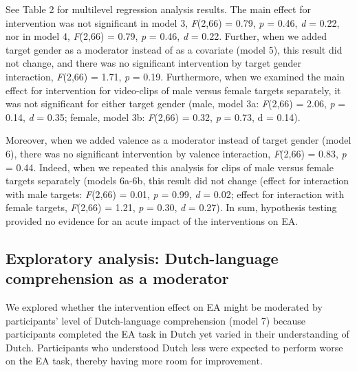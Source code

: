 \documentclass[authordate, empirical]{jote-new-article}
\begin{document}
	See Table 2 for multilevel regression analysis results. The main effect for intervention was not significant in model 3, \emph{F}(2,66) = 0.79, \emph{p} = 0.46, \emph{d} = 0.22, nor in model 4, \emph{F}(2,66) = 0.79, \emph{p} = 0.46, \emph{d} = 0.22. Further, when we added target gender as a moderator instead of as a covariate (model 5), this result did not change, and there was no significant intervention by target gender interaction, \emph{F}(2,66) = 1.71, \emph{p} = 0.19. Furthermore, when we examined the main effect for intervention for video-clips of male versus female targets separately, it was not significant for either target gender (male, model 3a: \emph{F}(2,66) = 2.06, \emph{p} = 0.14, \emph{d} = 0.35; female, model 3b: \emph{F}(2,66) = 0.32, \emph{p} = 0.73, d = 0.14).



	Moreover, when we added valence as a moderator instead of target gender (model 6), there was no significant intervention by valence interaction, \emph{F}(2,66) = 0.83, \emph{p} = 0.44. Indeed, when we repeated this analysis for clips of male versus female targets separately (models 6a-6b, this result did not change (effect for interaction with male targets: \emph{F}(2,66) = 0.01, \emph{p} = 0.99, \emph{d }= 0.02; effect for interaction with female targets, \emph{F}(2,66) = 1.21, \emph{p} = 0.30, \emph{d} = 0.27). In sum, hypothesis testing provided no evidence for an acute impact of the interventions on EA.



	\subsection{Exploratory analysis: Dutch-language comprehension as a moderator}



	We explored whether the intervention effect on EA might be moderated by participants' level of Dutch-language comprehension (model 7) because participants completed the EA task in Dutch yet varied in their understanding of Dutch. Participants who understood Dutch less were expected to perform worse on the EA task, thereby having more room for improvement.
\end{document}
